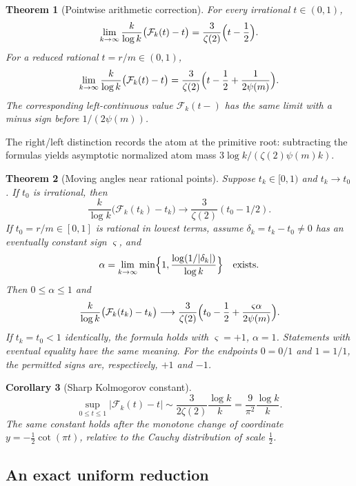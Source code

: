 \documentclass[11pt]{article}
\numberwithin{equation}{section}
\newtheorem{theorem}{Theorem}[section]
\newtheorem{corollary}[theorem]{Corollary}
\theoremstyle{definition}
\theoremstyle{remark}
\begin{document}
\begin{theorem}[Pointwise arithmetic correction]\label{mxc:hz:ar:thm:fixed}
For every irrational $t\in(0,1)$,
\[
 \lim_{k\to\infty}\frac{k}{\log k}\bigl(\mathcal F_k(t)-t\bigr)
 =\frac3{\zeta(2)}\Bigl(t-\frac12\Bigr).
\]
For a reduced rational $t=r/m\in(0,1)$,
\[
 \lim_{k\to\infty}\frac{k}{\log k}\bigl(\mathcal F_k(t)-t\bigr)
 =\frac3{\zeta(2)}\Bigl(t-\frac12+\frac1{2\psi(m)}\Bigr).
\]
The corresponding left-continuous value $\mathcal F_k(t-)$ has the same
limit with a minus sign before $1/(2\psi(m))$.
\end{theorem}

The right/left distinction records the atom at the primitive root:
subtracting the formulas yields asymptotic normalized atom mass
$3\log k/(\zeta(2)\psi(m)k)$.

\begin{theorem}[Moving angles near rational points]\label{mxc:hz:ar:thm:moving}
Suppose $t_k\in[0,1)$ and $t_k\to t_0$. If $t_0$ is irrational, then
\[
 \frac{k}{\log k}\bigl(\mathcal F_k(t_k)-t_k\bigr)
 \longrightarrow\frac3{\zeta(2)}(t_0-1/2).
\]
If $t_0=r/m\in[0,1]$ is rational in lowest terms, assume
$\delta_k=t_k-t_0\ne0$ has an eventually constant sign $\varsigma$, and
\[
 \alpha=\lim_{k\to\infty}
 \min\Bigl\{1,\frac{\log(1/|\delta_k|)}{\log k}\Bigr\}
 \quad\text{exists}.
\]
Then $0\le\alpha\le1$ and
\begin{equation}\label{mxc:hz:ar:eq:moving}
 \frac{k}{\log k}\bigl(\mathcal F_k(t_k)-t_k\bigr)
 \longrightarrow
 \frac3{\zeta(2)}\Bigl(t_0-\frac12+\frac{\varsigma\alpha}{2\psi(m)}\Bigr).
\end{equation}
If $t_k=t_0<1$ identically, the formula holds with $\varsigma=+1$,
$\alpha=1$. Statements with eventual equality have the same meaning. For
the endpoints $0=0/1$ and $1=1/1$, the permitted signs are, respectively,
$+1$ and $-1$.
\end{theorem}

\begin{corollary}[Sharp Kolmogorov constant]\label{mxc:hz:ar:cor:sharp}
\[
 \sup_{0\le t\le1}|\mathcal F_k(t)-t|
 \sim\frac{3}{2\zeta(2)}\frac{\log k}{k}
 =\frac9{\pi^2}\frac{\log k}{k}.
\]
The same constant holds after the monotone change of coordinate
$y=-\frac12\cot(\pi t)$, relative to the Cauchy distribution of scale
$\frac12$.
\end{corollary}

\subsection{An exact uniform reduction}
\end{document}
